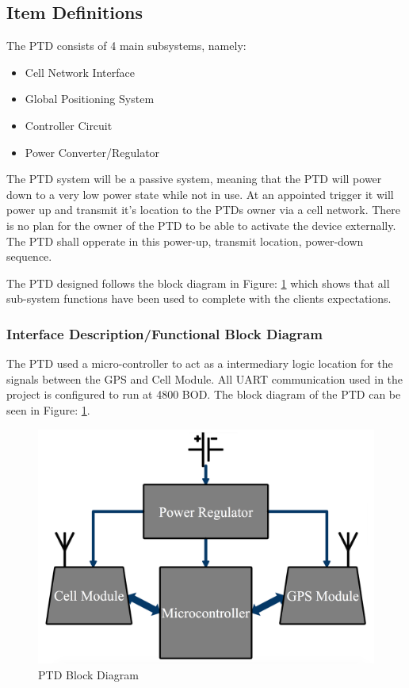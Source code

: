 \documentclass[11pt]{article}
\begin{document}
\subsection{Item Definitions}
The PTD consists of 4 main subsystems, namely:
\begin{itemize}
    \item Cell Network Interface
    \item Global Positioning System
    \item Controller Circuit
    \item Power Converter/Regulator
\end{itemize}
The PTD system will be a passive system, meaning that the PTD will power down to a very low power state while not in use. At an appointed 
trigger it will power up and transmit it's location to the PTDs owner via a cell network. There is no plan for the owner of the PTD to be able to 
activate the device externally. The PTD shall opperate in this power-up, transmit location, power-down sequence.

The PTD designed follows the block diagram in Figure: \ref{fig:block_diagram} which shows that all sub-system functions have been used to complete with the clients expectations.

\subsubsection{Interface Description/Functional Block Diagram}
The PTD used a micro-controller to act as a intermediary logic location for the signals between the GPS and Cell Module. All UART communication used in the project is configured to run
at 4800 BOD. The block diagram of the PTD can be seen in Figure: \ref{fig:block_diagram}.
\begin{figure}
    \centering
        \includegraphics[scale=0.25]{../documentation/block_diagram.png}
    \caption{PTD Block Diagram}
    \label{fig:block_diagram}
\end{figure}
\end{document}
